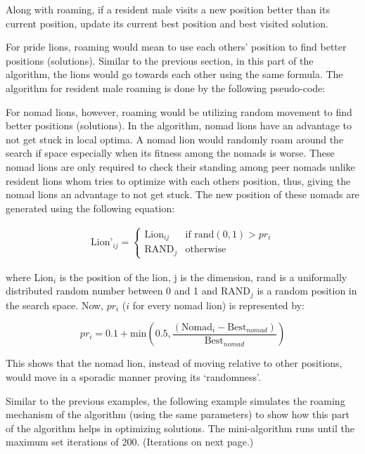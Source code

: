 Along with roaming, if a resident male visits a new position better than its current position, update its current best position and best visited solution.

For pride lions, roaming would mean to use each others' position to find better positions (solutions). Similar to the previous section, in this part of the algorithm, the lions would go towards each other using the same formula. The algorithm for resident male roaming is done by the following pseudo-code:



For nomad lions, however, roaming would be utilizing random movement to find better positions (solutions). In the algorithm, nomad lions have an advantage to not get stuck in local optima. A nomad lion would randomly roam around the search if space especially when its fitness among the nomads is worse. These nomad lions are only required to check their standing among peer nomads unlike resident lions whom tries to optimize with each others position, thus, giving the nomad lions an advantage to not get stuck. The new position of these nomads are generated using the following equation:

\begin{align*}
 \text{Lion'}_{ij} =
  \begin{cases}
   \text{Lion}_{ij}        & \text{if rand}(0,1)  > pr_i \\
   \text{RAND}_j        & \text{otherwise}
 \end{cases}
\end{align*}

where Lion$_{i}$ is the position of the lion, j is the dimension, rand is a uniformally distributed random number between 0 and 1 and RAND$_j$ is a random position in the search space. Now, $pr_i$ ($i$ for every nomad lion) is represented by:

$$
pr_i = 0.1 + \text{min}\left(0.5, \frac{ (\text{Nomad}_i - \text{Best}_{nomad}) }{ \text{Best}_{nomad} }\right)
$$

This shows that the nomad lion, instead of moving relative to other positions, would move in a sporadic manner proving its `randomness'.

Similar to the previous examples, the following example simulates the roaming mechanism of the algorithm (using the same parameters) to show how this part of the algorithm helps in optimizing solutions. The mini-algorithm runs until the maximum set iterations of 200. (Iterations on next page.)

